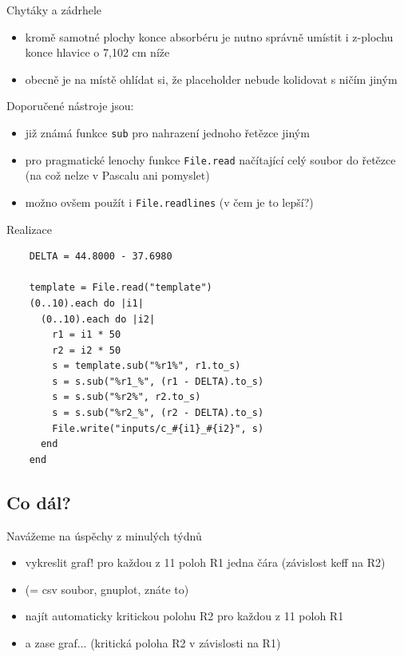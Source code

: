 \documentclass{beamer}
\begin{document}
\begin{frame}{Chytáky a zádrhele}
  \begin{itemize}
    \item kromě samotné plochy konce absorbéru je nutno správně umístit i z-plochu konce hlavice o 7,102 cm níže
    \item obecně je na místě ohlídat si, že placeholder nebude kolidovat s ničím jiným
  \end{itemize}
  Doporučené nástroje jsou:
  \begin{itemize}
    \item již známá funkce \texttt{sub} pro nahrazení jednoho řetězce jiným
    \item pro pragmatické lenochy funkce \texttt{File.read} načítající celý soubor do řetězce (na což nelze v Pascalu ani pomyslet)
    \item možno ovšem použít i \texttt{File.readlines} (v čem je to lepší?)
  \end{itemize}
\end{frame}

\begin{frame}[fragile]{Realizace}
  \scriptsize
  \begin{verbatim}
    DELTA = 44.8000 - 37.6980

    template = File.read("template")
    (0..10).each do |i1|
      (0..10).each do |i2|
        r1 = i1 * 50
        r2 = i2 * 50
        s = template.sub("%r1%", r1.to_s)
        s = s.sub("%r1_%", (r1 - DELTA).to_s)
        s = s.sub("%r2%", r2.to_s)
        s = s.sub("%r2_%", (r2 - DELTA).to_s)
        File.write("inputs/c_#{i1}_#{i2}", s)
      end
    end
  \end{verbatim}
\end{frame}

\subsection{Co dál?}

\begin{frame}{Navážeme na úspěchy z minulých týdnů}
  \begin{itemize}
    \item vykreslit graf! pro každou z 11 poloh R1 jedna čára (závislost keff na R2)
    \item (= csv soubor, gnuplot, znáte to)
    \item najít automaticky kritickou polohu R2 pro každou z 11 poloh R1
    \item a zase graf... (kritická poloha R2 v závislosti na R1)
  \end{itemize}
\end{frame}
\end{document}
